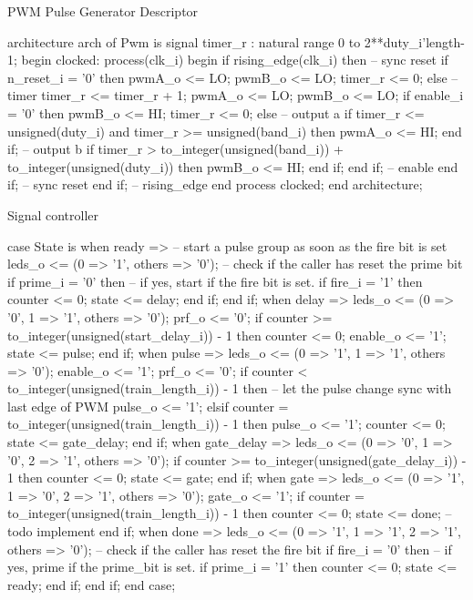 \begin{listing}[htbp]
	\caption{PWM Pulse Generator Descriptor}
	\label{lst:4_controlsystem_pulser_code}
	\begin{mintedvhdl}
architecture arch of Pwm is
	signal timer_r       : natural range 0 to 2**duty_i'length-1;
	begin
		clocked: process(clk_i)
		begin
			if rising_edge(clk_i) then
			-- sync reset
			if n_reset_i = '0' then
				pwmA_o   <= LO;
				pwmB_o   <= LO;
				timer_r <= 0;
			else
			-- timer
				timer_r <= timer_r + 1;
				pwmA_o   <= LO;
				pwmB_o   <= LO;
				if enable_i = '0' then
					pwmB_o   <= HI;
					timer_r <= 0;
				else
					-- output a
					if timer_r <= unsigned(duty_i) and timer_r >= unsigned(band_i)  then
						pwmA_o <= HI;
					end if;
					-- output b
					if timer_r > to_integer(unsigned(band_i)) + to_integer(unsigned(duty_i)) then
						pwmB_o <= HI;
					end if;
				end if; -- enable
			end if; -- sync reset
		end if; -- rising_edge
	end process clocked;
end architecture;
	\end{mintedvhdl}
\end{listing}

\begin{listing}[htbp]
\caption{Signal controller}
\label{lst:4_controlsystem_signalcontroller_code}
\begin{mintedvhdl}
case State is
	when ready =>  -- start a pulse group as soon as the fire bit is set
	leds_o <= (0 => '1', others => '0');
	-- check if the caller has reset the prime bit
	if prime_i = '0' then
		-- if yes, start if the fire bit is set.
		if fire_i = '1' then
			counter <= 0;
			state <= delay;
		end if;
	end if;
when delay =>
	leds_o <= (0 => '0', 1 => '1', others => '0');
	prf_o <= '0';
	if counter >= to_integer(unsigned(start_delay_i)) - 1 then
		counter <= 0;
		enable_o <= '1';
		state <= pulse;
	end if;
when pulse =>
	leds_o <= (0 => '1', 1 => '1', others => '0');
	enable_o <= '1';
	prf_o <= '0';
	if counter < to_integer(unsigned(train_length_i)) - 1 then  -- let the pulse change sync with last edge of PWM
		pulse_o <= '1';
	elsif counter = to_integer(unsigned(train_length_i)) - 1 then
		pulse_o <= '1';
		counter <= 0;
		state <= gate_delay;
	end if;
when gate_delay =>
	leds_o <= (0 => '0', 1 => '0', 2 => '1', others => '0');
	if counter >= to_integer(unsigned(gate_delay_i)) - 1 then
		counter <= 0;
		state <= gate;
	end if;
when gate =>
	leds_o <= (0 => '1', 1 => '0', 2 => '1', others => '0');
	gate_o <= '1';
	if counter = to_integer(unsigned(train_length_i)) - 1 then
		counter <= 0;
		state <= done;  -- todo implement
	end if;
when done =>
	leds_o <= (0 => '1', 1 => '1', 2 => '1', others => '0');
	-- check if the caller has reset the fire bit
	if fire_i = '0' then
		-- if yes, prime if the prime_bit is set.
		if prime_i = '1' then
			counter <= 0;
			state <= ready;
		end if;
	end if;
end case;
\end{mintedvhdl}
\end{listing}

